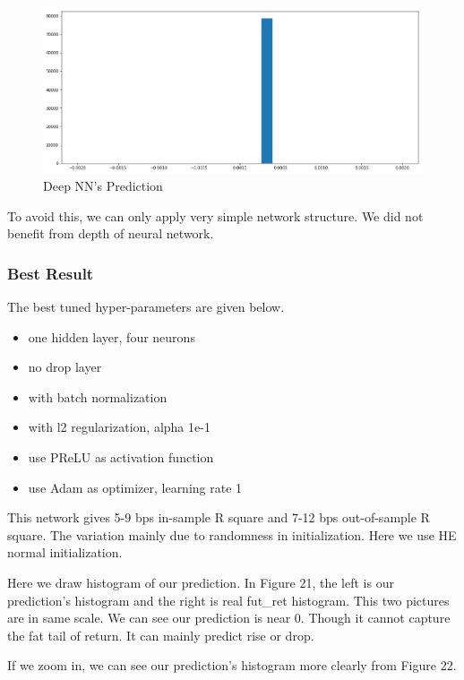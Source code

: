 \documentclass[onecolumn]{article}
\begin{document}
\begin{figure}[ht]
    \centering
    \includegraphics[scale=0.22]{NN_2.png}
    \caption{Deep NN's Prediction}
    \label{fig:label}
\end{figure}

To avoid this, we can only apply very simple network structure. We did not benefit from depth of neural network.


\subsubsection{Best Result}
The best tuned hyper-parameters are given below.
\begin{itemize}
    \item one hidden layer, four neurons
    \item no drop layer
    \item with batch normalization
    \item with l2 regularization, alpha 1e-1
    \item use PReLU as activation function
    \item use Adam as optimizer, learning rate 1
\end{itemize}

This network gives 5-9 bps in-sample R square and 7-12 bps out-of-sample R square. The variation mainly due to randomness in initialization. Here we use HE normal initialization.

Here we draw histogram of our prediction. In Figure 21, the left is our prediction's histogram and the right is real fut\_ret histogram. This two pictures are in same scale. We can see our prediction is near 0. Though it cannot capture the fat tail of return. It can mainly predict rise or drop.

If we zoom in, we can see our prediction's histogram more clearly from Figure 22.
\end{document}
